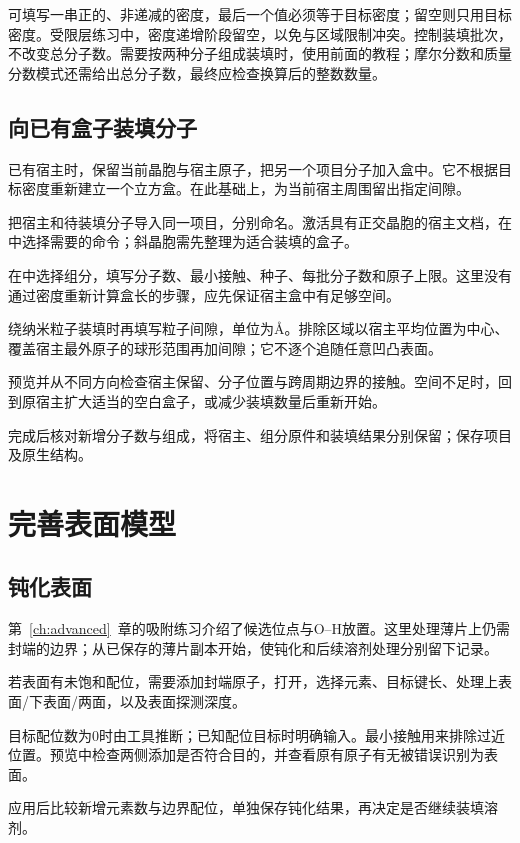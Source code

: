 可填写一串正的、非递减的密度，最后一个值必须等于目标密度；留空则只用目标密度。受限层练习中，密度递增阶段留空，以免与区域限制冲突。控制装填批次，不改变总分子数。需要按两种分子组成装填时，使用前面的教程；摩尔分数和质量分数模式还需给出总分子数，最终应检查换算后的整数数量。

\subsection{向已有盒子装填分子}\label{sec:host-packing-reference}

已有宿主时，保留当前晶胞与宿主原子，把另一个项目分子加入盒中。它不根据目标密度重新建立一个立方盒。在此基础上，为当前宿主周围留出指定间隙。

\begin{steps}
  \item 把宿主和待装填分子导入同一项目，分别命名。激活具有正交晶胞的宿主文档，在中选择需要的命令；斜晶胞需先整理为适合装填的盒子。
  \item 在中选择组分，填写分子数、最小接触、种子、每批分子数和原子上限。这里没有通过密度重新计算盒长的步骤，应先保证宿主盒中有足够空间。
  \item 绕纳米粒子装填时再填写粒子间隙，单位为\AA。排除区域以宿主平均位置为中心、覆盖宿主最外原子的球形范围再加间隙；它不逐个追随任意凹凸表面。
  \item 预览并从不同方向检查宿主保留、分子位置与跨周期边界的接触。空间不足时，回到原宿主扩大适当的空白盒子，或减少装填数量后重新开始。
  \item 完成后核对新增分子数与组成，将宿主、组分原件和装填结果分别保留；保存项目及原生结构。
\end{steps}

\section{完善表面模型}

\subsection{钝化表面}\label{sec:surface-finishing-reference}

第~\ref{ch:advanced}~章的吸附练习介绍了候选位点与O--H放置。这里处理薄片上仍需封端的边界；从已保存的薄片副本开始，使钝化和后续溶剂处理分别留下记录。

\begin{steps}
  \item 若表面有未饱和配位，需要添加封端原子，打开，选择元素、目标键长、处理上表面/下表面/两面，以及表面探测深度。
  \item 目标配位数为0时由工具推断；已知配位目标时明确输入。最小接触用来排除过近位置。预览中检查两侧添加是否符合目的，并查看原有原子有无被错误识别为表面。
  \item 应用后比较新增元素数与边界配位，单独保存钝化结果，再决定是否继续装填溶剂。
\end{steps}

